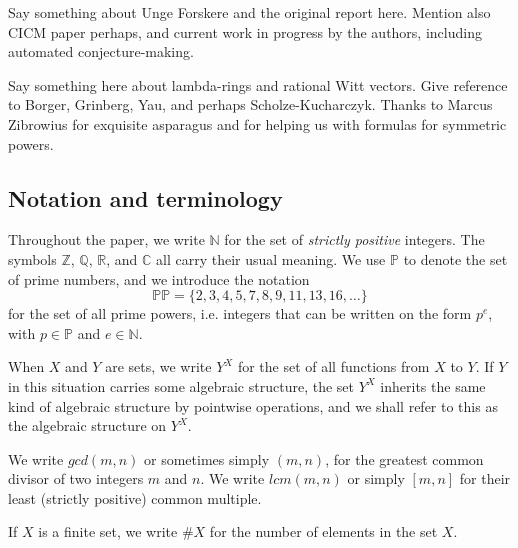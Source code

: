 Say something about Unge Forskere and the original report here. Mention also CICM paper perhaps, and current work in progress by the authors, including automated conjecture-making. 

Say something here about lambda-rings and rational Witt vectors. Give reference to Borger, Grinberg, Yau, and perhaps Scholze-Kucharczyk. Thanks to Marcus Zibrowius for exquisite asparagus and for helping us with formulas for symmetric powers.


\subsection{Notation and terminology}

Throughout the paper, we write $\mathbb{N}$ for the set of \emph{strictly positive} integers. The symbols $\mathbb{Z}$, $\mathbb{Q}$, $\mathbb{R}$, and $\mathbb{C}$ all carry their usual meaning. We use $\mathbb{P}$ to denote the set of prime numbers, and we introduce the notation
$$ \mathbb{PP} = \{ 2, 3, 4, 5, 7, 8, 9, 11, 13, 16, \ldots  \}  $$
for the set of all prime powers, i.e. integers that can be written on the form $p^e$, with $p \in \mathbb{P}$ and $e \in \mathbb{N}$.

When $X$ and $Y$ are sets, we write $Y^X$ for the set of all functions from $X$ to $Y$. If $Y$ in this situation carries some algebraic structure, the set $Y^X$ inherits the same kind of algebraic structure by pointwise operations, and we shall refer to this as the  algebraic structure on $Y^X$.

We write $gcd(m, n)$ or sometimes simply $(m, n)$, for the greatest common divisor of two integers $m$ and $n$. We write $lcm(m, n)$ or simply $[m ,n]$ for their least (strictly positive) common multiple.

If $X$ is a finite set, we write $\# X$ for the number of elements in the set $X$. 


